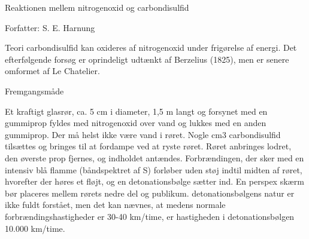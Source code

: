 

Reaktionen mellem nitrogenoxid og carbondisulfid

Forfatter: S. E. Harnung

Teori
carbondisulfid kan oxideres af nitrogenoxid under frigørelse af energi. Det
efterfølgende forsøg er oprindeligt udtænkt af Berzelius (1825), men er
senere omformet af Le Chatelier.

Fremgangsmåde

Et kraftigt glasrør, ca. 5 cm i diameter, 1,5 m langt og forsynet med en gummiprop
fyldes med nitrogenoxid over vand og lukkes med en anden gummiprop.
Der må helst ikke være vand i røret. Nogle cm3 carbondisulfid tilsættes og
bringes til at fordampe ved at ryste røret. Røret anbringes lodret, den
øverste prop fjernes, og indholdet antændes. Forbrændingen, der sker med
en intensiv blå flamme (båndspektret af S) forløber uden støj indtil midten af
røret, hvorefter der høres et fløjt, og en detonationsbølge sætter ind.
En perspex skærm bør placeres mellem rørets nedre del og publikum.
detonationsbølgens natur er ikke fuldt forstået, men det kan nævnes, at
medens normale forbrændingshastigheder er 30-40 km/time, er hastigheden i
detonationsbølgen 10.000 km/time.

